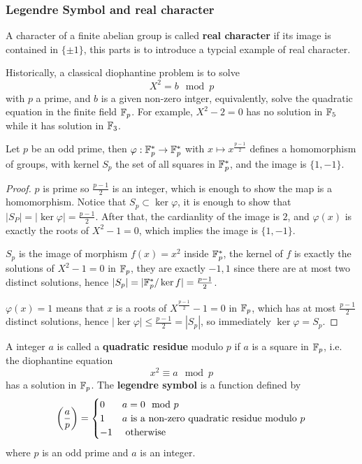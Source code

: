 \subsubsection{Legendre Symbol and real character}
A character of a finite abelian group is called \textbf{real character} if its image is contained in \(\{\pm 1\}\), this parts is to introduce a typcial example of real character.

Historically, a classical diophantine problem is to solve
\[X^2 = b \mod p\]
with \(p\) a prime, and \(b\) is a given non-zero intger, equivalently, solve the quadratic equation in the finite field \(\mathbb{F}_p\). For example,
\(X^2 - 2 = 0\) has no solution in \(\mathbb{F}_5\) while it has solution in \(\mathbb{F}_3\).

\begin{lemma}
    Let \(p\) be an odd prime, then \(\varphi: \mathbb{F}_p^* \to \mathbb{F}_p^*\) with \(x \mapsto x^{\frac{p-1}{2}}\) defines a homomorphism of groups, with kernel \(S_p\) the set of all squares in \(\mathbb{F}_p^*\), and the image is \(\{1,-1\}\).
\end{lemma}
\begin{proof}
    \(p\) is prime so \(\frac{p-1}{2}\) is an integer, which is enough to show the map is a homomorphism. Notice that \(S_p \subset \ker \varphi\), it is enough to show that \(|S_P| = |\ker \varphi| = \frac{p-1}{2}\). After that, the cardianlity of the image is \(2\), and \(\varphi(x)\) is exactly the roots of \(X^2-1 = 0\), which implies the image is \(\{1,-1\}\).

    \(S_p\) is the image of morphism \(f(x) = x^2\) inside \(\mathbb{F}_p^*\), the kernel of \(f\) is exactly the solutions of \(X^2-1=0\) in \(\mathbb{F}_p\), they are exactly \({-1,1}\) since there are at most two distinct solutions, hence \(|S_p| = |\mathbb{F}_p^*/\ker f| = \frac{p-1}{2}\).

    \(\varphi(x) = 1\) means that \(x\) is a roots of \(X^{\frac{p-1}{2}} - 1 = 0\) in \(\mathbb{F}_p\), which has at most \(\frac{p-1}{2}\) distinct solutions, hence \(|\ker \varphi| \leq \frac{p-1}{2} = |S_p|\), so immediately \(\ker \varphi = S_p\).
\end{proof}

\begin{colordefinition}
    A integer \(a\) is called a \textbf{quadratic residue} modulo \(p\) if \(a\) is a square in \(\mathbb{F}_p\), i.e. the diophantine equation
    \[x^2 \equiv a \mod p\]
    has a solution in \(\mathbb{F}_p\). The \textbf{legendre symbol} is a function defined by
    \[\left(\frac{a}{p}\right) = \begin{cases}
        0 & a = 0 \mod p \\
        1 & a \text{ is a non-zero quadratic residue modulo } p \\
        -1 &  \text{ otherwise }
    \end{cases}\]
    where \(p\) is an odd prime and \(a\) is an integer.
\end{colordefinition}


